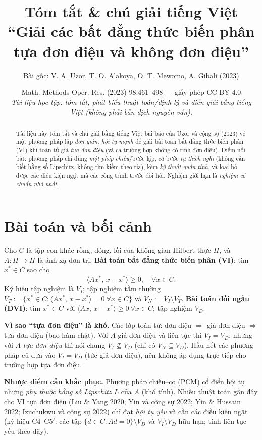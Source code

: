 \documentclass{MyBook}
\title{\vspace{-1.2cm}\bfseries Tóm tắt \& chú giải tiếng Việt\\[4pt]
\large ``Giải các bất đẳng thức biến phân tựa đơn điệu và không đơn điệu''}
\author{\normalsize Bài gốc: V. A. Uzor, T. O. Alakoya, O. T. Mewomo, A. Gibali (2023)}
\date{\small Math. Methods Oper. Res. (2023) 98:461--498 --- giấy phép CC BY 4.0\\[2pt]
\textit{Tài liệu học tập: tóm tắt, phát biểu thuật toán/định lý và diễn giải bằng tiếng Việt (không phải bản dịch nguyên văn).}}
\theoremstyle{plain}
\theoremstyle{definition}
\newcommand{\inp}[2]{\langle #1,\,#2\rangle}
\begin{document}
\frontmatter
\maketitle

\begin{abstract}
\noindent Tài liệu này tóm tắt và chú giải bằng tiếng Việt bài báo của Uzor và cộng sự (2023) về một phương pháp lặp \emph{đơn giản, hội tụ mạnh} để giải bài toán bất đẳng thức biến phân (VI) khi toán tử giá \emph{tựa đơn điệu} (và cả trường hợp không có tính đơn điệu). Điểm nổi bật: phương pháp chỉ dùng \emph{một phép chiếu}/bước lặp, cỡ bước \emph{tự thích nghi} (không cần biết hằng số Lipschitz, không tìm kiếm theo tia), kèm \emph{kỹ thuật quán tính}, và loại bỏ được các điều kiện ngặt mà các công trình trước đòi hỏi. Nghiệm giới hạn là \emph{nghiệm có chuẩn nhỏ nhất}.
\end{abstract}
\tableofcontents
\mainmatter

\chapter{Bài toán và bối cảnh}

Cho $C$ là tập con khác rỗng, đóng, lồi của không gian Hilbert thực $H$, và $A:H\to H$ là ánh xạ đơn trị. \textbf{Bài toán bất đẳng thức biến phân (VI)}: tìm $x^{*}\in C$ sao cho
\[
\inp{Ax^{*}}{x-x^{*}}\ge 0,\quad\forall x\in C. \tag{1.1}
\]
Ký hiệu tập nghiệm là $V_I$; tập nghiệm tầm thường $V_T:=\{x^{*}\in C:\inp{Ax^{*}}{x-x^{*}}=0\ \forall x\in C\}$ và $V_N:=V_I\setminus V_T$. \textbf{Bài toán đối ngẫu (DVI)}: tìm $x^{*}\in C$ với $\inp{Ax}{x-x^{*}}\ge 0\ \forall x\in C$; tập nghiệm $V_D$.

\medskip
\noindent\textbf{Vì sao ``tựa đơn điệu'' là khó.} Các lớp toán tử: đơn điệu $\Rightarrow$ giả đơn điệu $\Rightarrow$ tựa đơn điệu (bao hàm chặt). Với $A$ giả đơn điệu và liên tục thì $V_I=V_D$; nhưng với $A$ \emph{tựa đơn điệu} thì nói chung $V_I\not\subseteq V_D$ (chỉ có $V_N\subseteq V_D$). Hầu hết các phương pháp cũ dựa vào $V_I=V_D$ (tức giả đơn điệu), nên không áp dụng trực tiếp cho trường hợp tựa đơn điệu.

\medskip
\noindent\textbf{Nhược điểm cần khắc phục.} Phương pháp chiếu--co (PCM) cổ điển hội tụ nhưng \emph{phụ thuộc hằng số Lipschitz $L$} của $A$ (khó tính). Nhiều thuật toán gần đây cho VI tựa đơn điệu (Liu \& Yang 2020; Yin và cộng sự 2022; Yin \& Hussain 2022; Izuchukwu và cộng sự 2022) chỉ đạt \emph{hội tụ yếu} và cần các điều kiện ngặt (ký hiệu C4--C5$'$: các tập $\{d\in C:Ad=0\}\setminus V_D$ và $V_I\setminus V_D$ hữu hạn; tính liên tục yếu theo dãy).
\end{document}
